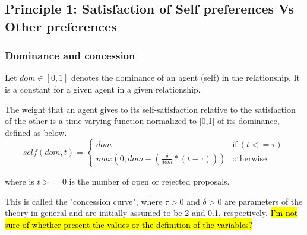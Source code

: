 \documentclass{article}
\begin{document}
	\subsection{Principle 1: Satisfaction of Self preferences Vs Other preferences}
	
	\subsubsection{Dominance and concession}
	Let  $dom \in [0, 1] $ denotes the dominance of an agent (self) in the 	relationship.  It is a constant for a given agent in a given	relationship.
	
	The weight that an agent gives to its self-satisfaction relative to	the satisfaction of the other is a time-varying function normalized to 	[0,1] of its dominance, defined as below.
		$$self(dom, t) = \left\{\begin{array}{ll}
		dom & \mathrm{if\ } (t <= \tau)\\
		max(0, dom - (\frac{\delta}{dom} * (t - \tau))) & \mathrm{otherwise}
		\end{array}\right.$$
		
	
	where is $t >= 0$ is the number of open or rejected proposals.
	
	This is called the "concession curve", where $\tau > 0$ and $\delta > 0$
	are parameters of the theory in general and are initially assumed to
	be 2 and 0.1, respectively. \hl {I'm not sure of whether present the values or the definition of the variables? }
\end{document}
